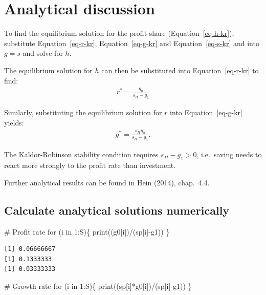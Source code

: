 \documentclass[
  letterpaper,
  DIV=11,
  numbers=noendperiod]{scrreprt}
\newenvironment{Shaded}{\begin{snugshade}}{\end{snugshade}}
\newcommand{\CommentTok}[1]{\textcolor[rgb]{0.37,0.37,0.37}{#1}}
\newcommand{\ControlFlowTok}[1]{\textcolor[rgb]{0.00,0.23,0.31}{#1}}
\newcommand{\DecValTok}[1]{\textcolor[rgb]{0.68,0.00,0.00}{#1}}
\newcommand{\FunctionTok}[1]{\textcolor[rgb]{0.28,0.35,0.67}{#1}}
\newcommand{\NormalTok}[1]{\textcolor[rgb]{0.00,0.23,0.31}{#1}}
\newcommand{\SpecialCharTok}[1]{\textcolor[rgb]{0.37,0.37,0.37}{#1}}
\begin{document}
\section{Analytical discussion}\label{analytical-discussion-3}

To find the equilibrium solution for the profit share
(Equation~\ref{eq-h-kr}), substitute Equation~\ref{eq-r-kr},
Equation~\ref{eq-g-kr} and Equation~\ref{eq-s-kr} and into \(g=s\) and
solve for \(h\).

The equilibrium solution for \(h\) can then be substituted into
Equation~\ref{eq-r-kr} to find: \begin{align}
r^* = \frac{g_0}{s_\Pi-g_1}
\end{align}

Similarly, substituting the equilibrium solution for \(r\) into
Equation~\ref{eq-g-kr} yields: \begin{align}
g^* = \frac{s_\Pi g_0}{s_\Pi-g_1}.
\end{align}

The Kaldor-Robinson stability condition requires \(s_\Pi-g_1>0\),
i.e.~saving needs to react more strongly to the profit rate than
investment.

Further analytical results can be found in Hein (2014), chap.~4.4.

\subsection{Calculate analytical solutions
numerically}\label{calculate-analytical-solutions-numerically}

\begin{Shaded}
\begin{Highlighting}[]
\CommentTok{\# Profit rate}
\ControlFlowTok{for}\NormalTok{ (i }\ControlFlowTok{in} \DecValTok{1}\SpecialCharTok{:}\NormalTok{S)\{}
  \FunctionTok{print}\NormalTok{((g0[i])}\SpecialCharTok{/}\NormalTok{(sp[i]}\SpecialCharTok{{-}}\NormalTok{g1))}
\NormalTok{\}}
\end{Highlighting}
\end{Shaded}

\begin{verbatim}
[1] 0.06666667
[1] 0.1333333
[1] 0.03333333
\end{verbatim}

\begin{Shaded}
\begin{Highlighting}[]
\CommentTok{\# Growth rate}
\ControlFlowTok{for}\NormalTok{ (i }\ControlFlowTok{in} \DecValTok{1}\SpecialCharTok{:}\NormalTok{S)\{}
  \FunctionTok{print}\NormalTok{((sp[i]}\SpecialCharTok{*}\NormalTok{g0[i])}\SpecialCharTok{/}\NormalTok{(sp[i]}\SpecialCharTok{{-}}\NormalTok{g1))}
\NormalTok{\}}
\end{Highlighting}
\end{Shaded}
\end{document}
